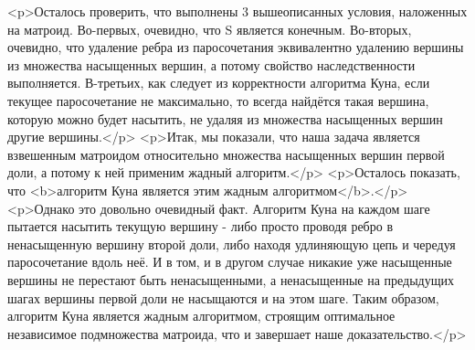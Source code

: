 <p>Осталось проверить, что выполнены 3 вышеописанных условия, наложенных на матроид. Во-первых, очевидно, что S является конечным. Во-вторых, очевидно, что удаление ребра из паросочетания эквивалентно удалению вершины из множества насыщенных вершин, а потому свойство наследственности выполняется. В-третьих, как следует из корректности алгоритма Куна, если текущее паросочетание не максимально, то всегда найдётся такая вершина, которую можно будет насытить, не удаляя из множества насыщенных вершин другие вершины.</p>
<p>Итак, мы показали, что наша задача является взвешенным матроидом относительно множества насыщенных вершин первой доли, а потому к ней применим жадный алгоритм.</p>
<p>Осталось показать, что <b>алгоритм Куна является этим жадным алгоритмом</b>.</p>
<p>Однако это довольно очевидный факт. Алгоритм Куна на каждом шаге пытается насытить текущую вершину - либо просто проводя ребро в ненасыщенную вершину второй доли, либо находя удлиняющую цепь и чередуя паросочетание вдоль неё. И в том, и в другом случае никакие уже насыщенные вершины не перестают быть ненасыщенными, а ненасыщенные на предыдущих шагах вершины первой доли не насыщаются и на этом шаге. Таким образом, алгоритм Куна является жадным алгоритмом, строящим оптимальное независимое подмножества матроида, что и завершает наше доказательство.</p>